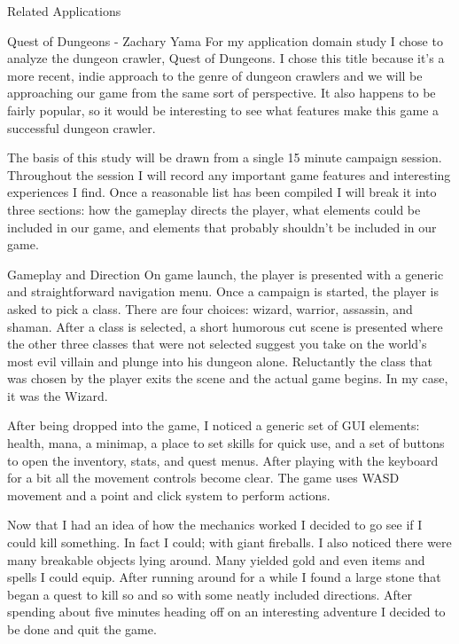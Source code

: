 \documentclass[12pt]{report}
\begin{document}
\begin{section}{Related Applications}
\begin{subsection}{Quest of Dungeons - Zachary Yama}
For my application domain study I chose to analyze the dungeon crawler,
Quest of Dungeons. I chose this title because it’s a more recent, indie
approach to the genre of dungeon crawlers and we will be approaching our
game from the same sort of perspective. It also happens to be fairly
popular, so it would be interesting to see what features make this game a
successful dungeon crawler.
 
The basis of this study will be drawn from a single 15 minute campaign
session. Throughout the session I will record any important game features
and interesting experiences I find. Once a reasonable list has been
compiled I will break it into three sections: how the gameplay directs 
the player, what elements could be included in our game, and elements that
probably shouldn’t be included in our game.
 
\begin{subsubsection}{Gameplay and Direction}
On game launch, the player is presented with a generic and straightforward
navigation menu. Once a campaign is started, the player is asked to pick a
class. There are four choices: wizard, warrior, assassin, and shaman. After
a class is selected, a short humorous cut scene is presented where the
other three classes that were not selected suggest you take on the world’s
most evil villain and plunge into his dungeon alone. Reluctantly the class
that was chosen by the player exits the scene and the actual game begins.
In my case, it was the Wizard.
 
After being dropped into the game, I noticed a generic set of GUI elements:
health, mana, a minimap, a place to set skills for quick use, and a set of
buttons to open the inventory, stats, and quest menus. After playing with
the keyboard for a bit all the movement controls become clear. The game
uses WASD movement and a point and click system to perform actions.
 
Now that I had an idea of how the mechanics worked I decided to go see if I
could kill something. In fact I could; with giant fireballs. I also noticed
there were many breakable objects lying around. Many yielded gold and even
items and spells I could equip. After running around for a while I found a
large stone that began a quest to kill so and so with some neatly included 
directions. After spending about five minutes heading off on an interesting
adventure I decided to be done and quit the game.
\end{subsubsection}
 

\end{subsection}
\end{section}
\end{document}

